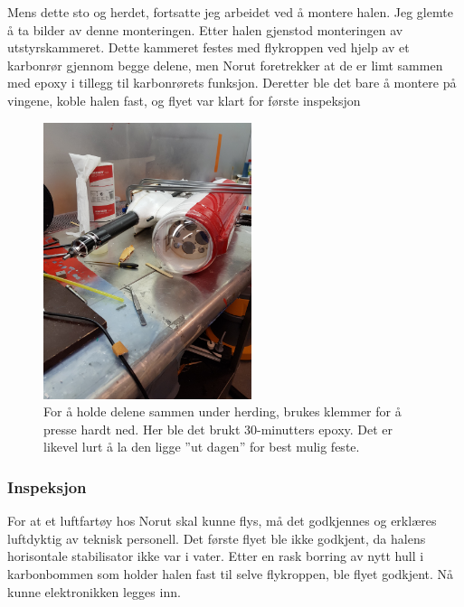 \documentclass[12pt, a4paper]{report}
\begin{document}
Mens dette sto og herdet, fortsatte jeg arbeidet ved å montere halen. Jeg glemte å ta bilder av denne monteringen. Etter halen gjenstod monteringen av utstyrskammeret. Dette kammeret festes med flykroppen ved hjelp av et karbonrør gjennom begge delene, men Norut foretrekker at de er limt sammen med epoxy i tillegg til karbonrørets funksjon. Deretter ble det bare å montere på vingene, koble halen fast, og flyet var klart for første inspeksjon

\begin{figure}[ht]
	\centering
	\includegraphics[width = .5\textwidth, height = 8.1cm]{bilder/kammermontering.jpg}
	\caption{For å holde delene sammen under herding, brukes klemmer for å presse hardt ned. Her ble det brukt 30-minutters epoxy. Det er likevel lurt å la den ligge ''ut dagen'' for best mulig feste.}
\end{figure}
\newpage
\subsubsection{Inspeksjon}
For at et luftfartøy hos Norut skal kunne flys, må det godkjennes og erklæres luftdyktig av teknisk personell. Det første flyet ble ikke godkjent, da halens horisontale stabilisator ikke var i vater. Etter en rask borring av nytt hull i karbonbommen som holder halen fast til selve flykroppen, ble flyet godkjent. Nå kunne elektronikken legges inn. \\
\end{document}
